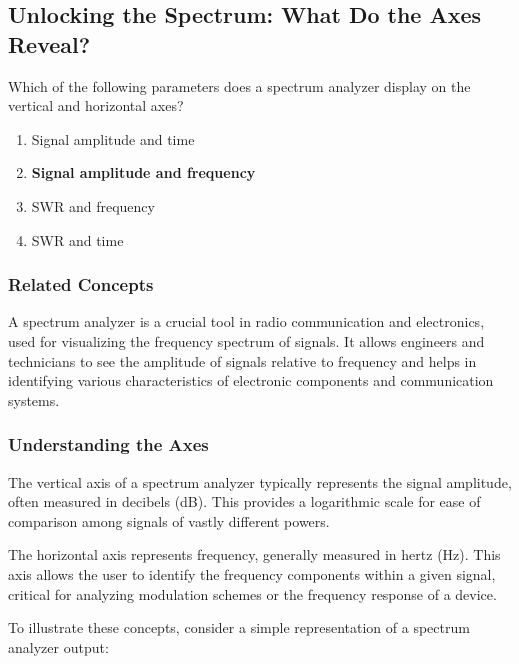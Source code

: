 \subsection{Unlocking the Spectrum: What Do the Axes Reveal?}

\begin{tcolorbox}[colback=gray!10, colframe=black, title=E4A02] 

Which of the following parameters does a spectrum analyzer display on the vertical and horizontal axes?
\begin{enumerate}[label=\Alph*.]
    \item Signal amplitude and time
    \item \textbf{Signal amplitude and frequency}
    \item SWR and frequency
    \item SWR and time
\end{enumerate} \end{tcolorbox}

\subsubsection{Related Concepts}

A spectrum analyzer is a crucial tool in radio communication and electronics, used for visualizing the frequency spectrum of signals. It allows engineers and technicians to see the amplitude of signals relative to frequency and helps in identifying various characteristics of electronic components and communication systems.

\subsubsection{Understanding the Axes}

The vertical axis of a spectrum analyzer typically represents the signal amplitude, often measured in decibels (dB). This provides a logarithmic scale for ease of comparison among signals of vastly different powers. 

The horizontal axis represents frequency, generally measured in hertz (Hz). This axis allows the user to identify the frequency components within a given signal, critical for analyzing modulation schemes or the frequency response of a device.

To illustrate these concepts, consider a simple representation of a spectrum analyzer output:

\begin{center}
\end{center}

